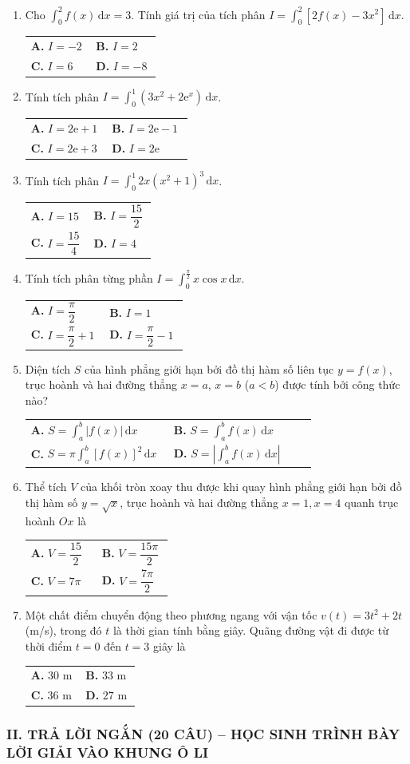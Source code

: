 \documentclass[12pt,a4paper]{article}
\makeatletter
\newcommand{\bonpa}[4]{\par\nobreak\smallskip\nobreak\noindent
\begin{tabular}{@{}p{0.48\linewidth}p{0.48\linewidth}@{}}
\textbf{A.} #1 & \textbf{B.} #2\\[7pt]
\textbf{C.} #3 & \textbf{D.} #4\end{tabular}}
\makeatother
\begin{document}
\begin{enumerate}[start=16]
\item Cho $\int_0^2 f(x)\,\mathrm{d}x = 3$. Tính giá trị của tích phân $I = \int_0^2 [2f(x) - 3x^2]\,\mathrm{d}x$.
\bonpa{$I = -2$}{$I = 2$}{$I = 6$}{$I = -8$}

\item Tính tích phân $I = \int_0^1 (3x^2 + 2\mathrm{e}^x)\,\mathrm{d}x$.
\bonpa{$I = 2\mathrm{e} + 1$}{$I = 2\mathrm{e} - 1$}{$I = 2\mathrm{e} + 3$}{$I = 2\mathrm{e}$}

\item Tính tích phân $I = \int_0^1 2x(x^2+1)^3\,\mathrm{d}x$.
\bonpa{$I = 15$}{$I = \dfrac{15}{2}$}{$I = \dfrac{15}{4}$}{$I = 4$}

\item Tính tích phân từng phần $I = \int_0^{\frac{\pi}{2}} x\cos x\,\mathrm{d}x$.
\bonpa{$I = \dfrac{\pi}{2}$}{$I = 1$}{$I = \dfrac{\pi}{2} + 1$}{$I = \dfrac{\pi}{2} - 1$}

\item Diện tích $S$ của hình phẳng giới hạn bởi đồ thị hàm số liên tục $y = f(x)$, trục hoành và hai đường thẳng $x = a$, $x = b$ ($a < b$) được tính bởi công thức nào?
\bonpa{$S = \int_a^b |f(x)|\,\mathrm{d}x$}{$S = \int_a^b f(x)\,\mathrm{d}x$}{$S = \pi\int_a^b [f(x)]^2\,\mathrm{d}x$}{$S = \left|\int_a^b f(x)\,\mathrm{d}x\right|$}

\item Thể tích $V$ của khối tròn xoay thu được khi quay hình phẳng giới hạn bởi đồ thị hàm số $y = \sqrt{x}$, trục hoành và hai đường thẳng $x = 1, x = 4$ quanh trục hoành $Ox$ là
\bonpa{$V = \dfrac{15}{2}$}{$V = \dfrac{15\pi}{2}$}{$V = 7\pi$}{$V = \dfrac{7\pi}{2}$}

\item Một chất điểm chuyển động theo phương ngang với vận tốc $v(t) = 3t^2 + 2t$ (m/s), trong đó $t$ là thời gian tính bằng giây. Quãng đường vật đi được từ thời điểm $t = 0$ đến $t = 3$ giây là
\bonpa{$30\text{ m}$}{$33\text{ m}$}{$36\text{ m}$}{$27\text{ m}$}
\end{enumerate}

\subsubsection*{II. TRẢ LỜI NGẮN (20 CÂU) -- HỌC SINH TRÌNH BÀY LỜI GIẢI VÀO KHUNG Ô LI}
\end{document}
